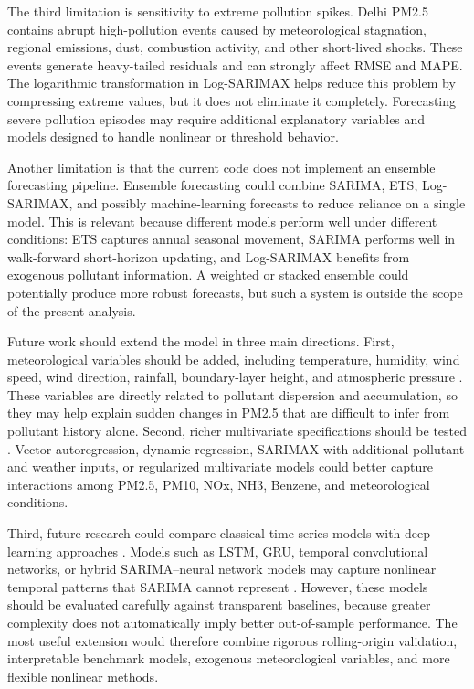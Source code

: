\documentclass[11pt]{article}
\begin{document}
The third limitation is sensitivity to extreme pollution spikes. Delhi PM2.5 contains abrupt high-pollution events caused by meteorological stagnation, regional emissions, dust, combustion activity, and other short-lived shocks. These events generate heavy-tailed residuals and can strongly affect RMSE and MAPE. The logarithmic transformation in Log-SARIMAX helps reduce this problem by compressing extreme values, but it does not eliminate it completely. Forecasting severe pollution episodes may require additional explanatory variables and models designed to handle nonlinear or threshold behavior.

Another limitation is that the current code does not implement an ensemble forecasting pipeline. Ensemble forecasting could combine SARIMA, ETS, Log-SARIMAX, and possibly machine-learning forecasts to reduce reliance on a single model. This is relevant because different models perform well under different conditions: ETS captures annual seasonal movement, SARIMA performs well in walk-forward short-horizon updating, and Log-SARIMAX benefits from exogenous pollutant information. A weighted or stacked ensemble could potentially produce more robust forecasts, but such a system is outside the scope of the present analysis.

Future work should extend the model in three main directions. First, meteorological variables should be added, including temperature, humidity, wind speed, wind direction, rainfall, boundary-layer height, and atmospheric pressure \cite{feng2024,hu2024}. These variables are directly related to pollutant dispersion and accumulation, so they may help explain sudden changes in PM2.5 that are difficult to infer from pollutant history alone. Second, richer multivariate specifications should be tested \cite{nguyen2024,feng2024,hu2024}. Vector autoregression, dynamic regression, SARIMAX with additional pollutant and weather inputs, or regularized multivariate models could better capture interactions among PM2.5, PM10, NOx, NH3, Benzene, and meteorological conditions.

Third, future research could compare classical time-series models with deep-learning approaches \cite{necula2025,cheng2026}. Models such as LSTM, GRU, temporal convolutional networks, or hybrid SARIMA--neural network models may capture nonlinear temporal patterns that SARIMA cannot represent \cite{necula2025,cheng2026}. However, these models should be evaluated carefully against transparent baselines, because greater complexity does not automatically imply better out-of-sample performance. The most useful extension would therefore combine rigorous rolling-origin validation, interpretable benchmark models, exogenous meteorological variables, and more flexible nonlinear methods.
\end{document}
